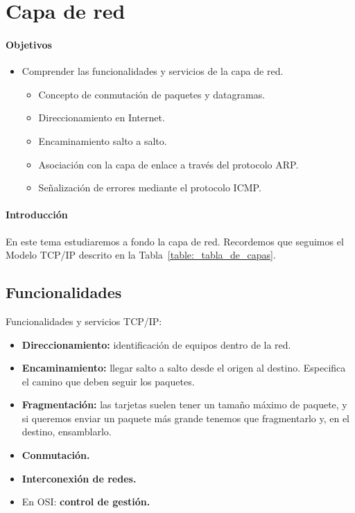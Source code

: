 \chapter{Capa de red}

\subsubsection{Objetivos}

\begin{itemize}
    \item Comprender las funcionalidades y servicios de la capa de red.
        \begin{itemize}
            \item Concepto de conmutación de paquetes y datagramas. 
            \item Direccionamiento en Internet.
            \item Encaminamiento salto a salto.
            \item Asociación con la capa de enlace a través del protocolo \acrshort{ARP}.
            \item Señalización de errores mediante el protocolo \acrshort{ICMP}.
        \end{itemize}
\end{itemize}

\subsubsection{Introducción}

En este tema estudiaremos a fondo la capa de red. Recordemos que seguimos el Modelo TCP/IP descrito en la Tabla~\ref{table:_tabla_de_capas}.

\section{Funcionalidades}

Funcionalidades y servicios TCP\@/IP\@:
\begin{itemize}
    \item \textbf{Direccionamiento:} identificación de equipos dentro de la red.
    \item \textbf{Encaminamiento:} llegar salto a salto desde el origen al destino. Especifica el camino que deben seguir los paquetes.
    \item \textbf{Fragmentación:} las tarjetas suelen tener un tamaño máximo de paquete, y si queremos enviar un paquete más grande tenemos que fragmentarlo y, en el destino, ensamblarlo. 
    \item \textbf{Conmutación.} 
    \item \textbf{Interconexión de redes.}
    \item En OSI\@: \textbf{control de gestión.}
\end{itemize}

